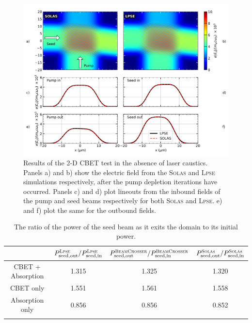 \begin{figure}[t!]
    \includegraphics[width=1.0\linewidth]{Numerics/Images/CBET_test_nocaustics.png}
    \centering
    \caption{Results of the 2-D \ac{CBET} test in the absence of laser caustics.
    Panels a) and b) show the electric field from the \textsc{Solas} and \textsc{Lpse} simulations respectively, after the pump depletion iterations have occurred.
    Panels c) and d) plot lineouts from the inbound fields of the pump and seed beams respectively for both \textsc{Solas} and \textsc{Lpse}.
    e) and f) plot the same for the outbound fields.}%
    \label{fig:SOLAS_CBET_test_nocaustics}
\end{figure}

\begin{table}[ht]
    \centering
    \caption{The ratio of the power of the seed beam as it exits the domain to its initial power.}
    \begin{tabular}{cccc} \hhline{====}
    & $P_{\text{seed,out}}^{\textsc{Lpse}}/P_{\text{seed,in}}^{\textsc{Lpse}}$ & $P_{\text{seed,out}}^{\textsc{BeamCrosser}}/P_{\text{seed,in}}^{\textsc{BeamCrosser}}$ & $P_{\text{seed,out}}^{\textsc{Solas}}/P_{\text{seed,in}}^{\textsc{Solas}}$ \\ 
    \midrule
    CBET + Absorption & 1.315 & 1.325 & 1.320 \\
    CBET only & 1.551 & 1.561 & 1.558 \\
    Absorption only & 0.856 & 0.856 & 0.852 \\ \hhline{====}
    \end{tabular}%
    \label{tab:nocaustic_CBET_table}
\end{table}

